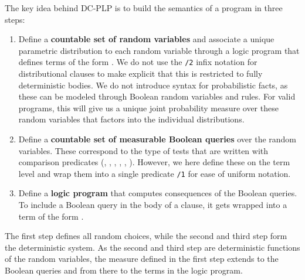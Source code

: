 The key idea behind DC-PLP is to build the semantics of a program in three steps:
\begin{enumerate}
	\item Define a {\bf countable set of random variables}
	and associate a unique parametric distribution
	to each random variable through a logic program that defines terms of the form . We do not use the \lstinline[columns=fixed]|/2| infix notation for distributional clauses to make explicit that this is restricted to fully deterministic bodies. We do not introduce syntax for probabilistic facts, as these can be modeled through Boolean random variables and rules.
	For valid programs, this will give us a 
	unique joint probability measure over these random variables that factors into the individual distributions.
	\item Define a {\bf countable set of measurable Boolean queries}
	over the random variables. These correspond to the type of tests that are written with comparison predicates (\probloginline{<}, \probloginline{=<}, \probloginline{>}, \probloginline{>=}, \probloginline{=:=}, \probloginline{=\=}). However, we here define these on the term level and wrap them into a single predicate \lstinline[columns=fixed]|/1| for ease of uniform notation.
	\item Define a {\bf logic program} that computes consequences of the Boolean queries. To include a  Boolean query  in the body of a clause, it gets wrapped into a term of the form . 
\end{enumerate}

The first step defines all random choices, while the second and third step form the deterministic system. 
As the second and third step are deterministic functions of the random variables, the measure defined in the first step extends to the Boolean queries and from there to the terms in the logic program.



